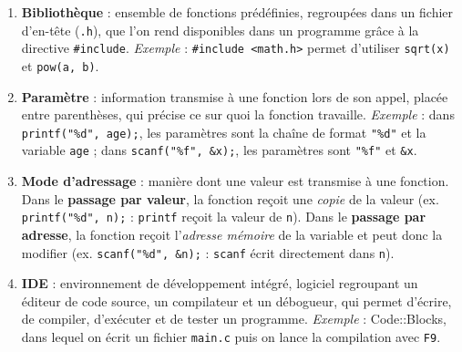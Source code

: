 \documentclass[11pt]{article}
\begin{document}
\begin{corrige}
\begin{enumerate}
\item \textbf{Bibliothèque} : ensemble de fonctions prédéfinies, regroupées dans un fichier d'en-tête (\texttt{.h}), que l'on rend disponibles dans un programme grâce à la directive \texttt{\#include}. \emph{Exemple} : \texttt{\#include <math.h>} permet d'utiliser \texttt{sqrt(x)} et \texttt{pow(a, b)}.
\item \textbf{Paramètre} : information transmise à une fonction lors de son appel, placée entre parenthèses, qui précise ce sur quoi la fonction travaille. \emph{Exemple} : dans \texttt{printf("\%d", age);}, les paramètres sont la chaîne de format \texttt{"\%d"} et la variable \texttt{age} ; dans \texttt{scanf("\%f", \&x);}, les paramètres sont \texttt{"\%f"} et \texttt{\&x}.
\item \textbf{Mode d'adressage} : manière dont une valeur est transmise à une fonction. Dans le \textbf{passage par valeur}, la fonction reçoit une \emph{copie} de la valeur (ex. \texttt{printf("\%d", n);} : \texttt{printf} reçoit la valeur de \texttt{n}). Dans le \textbf{passage par adresse}, la fonction reçoit l'\emph{adresse mémoire} de la variable et peut donc la modifier (ex. \texttt{scanf("\%d", \&n);} : \texttt{scanf} écrit directement dans \texttt{n}).
\item \textbf{IDE} : environnement de développement intégré, logiciel regroupant un éditeur de code source, un compilateur et un débogueur, qui permet d'écrire, de compiler, d'exécuter et de tester un programme. \emph{Exemple} : Code::Blocks, dans lequel on écrit un fichier \texttt{main.c} puis on lance la compilation avec \texttt{F9}.
\end{enumerate}
\end{corrige}
\end{document}
